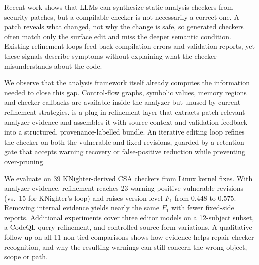 Recent work shows that LLMs can synthesize static-analysis checkers from security patches, but a compilable checker is not necessarily a correct one.
A patch reveals what changed, not why the change is safe, so generated checkers often match only the surface edit and miss the deeper semantic condition.
Existing refinement loops feed back compilation errors and validation reports, yet these signals describe symptoms without explaining what the checker misunderstands about the code.

We observe that the analysis framework itself already computes the information needed to close this gap.
Control-flow graphs, symbolic values, memory regions and checker callbacks are available inside the analyzer but unused by current refinement strategies.
\toolname is a plug-in refinement layer that extracts patch-relevant analyzer evidence and assembles it with source context and validation feedback into a structured, provenance-labelled bundle.
An iterative editing loop refines the checker on both the vulnerable and fixed revisions, guarded by a retention gate that accepts warning recovery or false-positive reduction while preventing over-pruning.

We evaluate \toolname on 39 KNighter-derived CSA checkers from Linux kernel fixes.
With analyzer evidence, refinement reaches 23 warning-positive vulnerable revisions (vs.\ 15 for KNighter's loop) and raises version-level $F_1$ from $0.448$ to $0.575$.
Removing internal evidence yields nearly the same $F_1$ with fewer fixed-side reports.
Additional experiments cover three editor models on a 12-subject subset, a CodeQL query refinement, and controlled source-form variations.
A qualitative follow-up on all 11 non-tied comparisons shows how evidence helps repair checker recognition, and why the resulting warnings can still concern the wrong object, scope or path.
